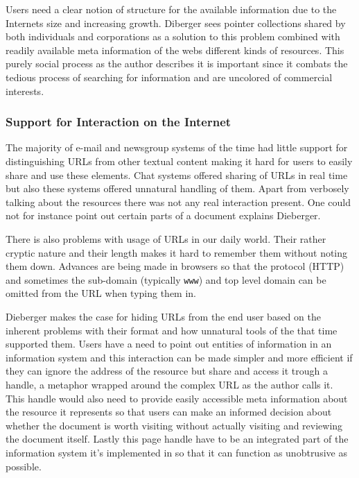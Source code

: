 \documentclass[12pt,a4paper]{article}
\begin{document}
Users need a clear notion of structure for the available information due to
the Internets size and increasing growth. Diberger sees pointer collections
shared by both individuals and corporations as a solution to this
problem combined with readily available meta information of the webs
different kinds of resources. This purely social process as the author
describes it is important since it combats the tedious process of searching for
information and are uncolored of commercial interests.

\subsubsection{Support for Interaction on the Internet}

The majority of e-mail and newsgroup systems of the time had little support
for distinguishing URLs from other textual content making it hard for users to
easily share and use these elements. Chat systems offered sharing of URLs in
real time but also these systems offered unnatural handling of them.
Apart from verbosely talking about the resources there was not any real
interaction present. One could not for instance point out certain parts of a
document explains Dieberger.

There is also problems with usage of URLs in our daily world. Their rather
cryptic nature and their length makes it hard to remember them without noting
them down. Advances are being made in browsers so that the protocol (HTTP)
and sometimes the sub-domain (typically \texttt{www}) and top level domain can
be omitted from the URL when typing them in.

Dieberger makes the case for hiding URLs from the end user based on the
inherent problems with their format and how unnatural tools of the that time
supported them. Users have a need to point out entities of information in an
information system and this interaction can be made simpler and more efficient
if they can ignore the address of the resource but share and access it trough
a handle, a metaphor wrapped around the complex URL as the author calls it.
This handle would also need to provide easily accessible meta information
about the resource it represents so that users can make an informed decision
about whether the document is worth visiting without actually visiting and
reviewing the document itself. Lastly this page handle have to be an
integrated part of the information system it's implemented in so that it
can function as unobtrusive as possible.
\end{document}
